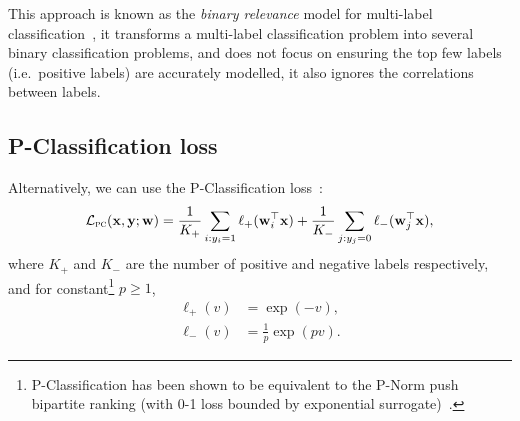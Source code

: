 \documentclass[9pt]{extarticle}
\newcommand{\x}{\mathbf{x}}
\newcommand{\y}{\mathbf{y}}
\newcommand{\1}{\mathbf{1}}
\newcommand{\w}{\mathbf{w}}
\newcommand{\LCal}{\mathcal{L}}
\newcommand{\ie}{i.e.\ }
\begin{document}
This approach is known as the \emph{binary relevance} model for multi-label classification~\cite{read2011classifier},
it transforms a multi-label classification problem into several binary classification problems, 
and does not focus on ensuring the top few labels (\ie positive labels) are accurately modelled,
it also ignores the correlations between labels.


\subsection{P-Classification loss}
\label{ssec:pc}

Alternatively, we can use the P-Classification loss~\cite{ertekin2011equivalence}:
\begin{equation}
\label{eq:loss_pc}
\LCal_\textsc{pc}(\x, \y; \w) = \frac{1}{K_+} \sum_{i:y_i=1} \ell_+(\w_i^\top \x) + \frac{1}{K_-} \sum_{j:y_j=0} \ell_-(\w_j^\top \x),
\end{equation}
where $K_+$ and $K_-$ are the number of positive and negative labels respectively,
and for constant\footnote{P-Classification has been shown to be equivalent to the P-Norm push bipartite ranking 
(with 0-1 loss bounded by exponential surrogate)~\cite{ertekin2011equivalence}.}
$p \ge 1$,
\begin{equation}
\begin{aligned}
\ell_+(v) & = \exp(-v), \\
\ell_-(v) & = \frac{1}{p} \exp(pv).
\end{aligned}
\end{equation}
\end{document}
